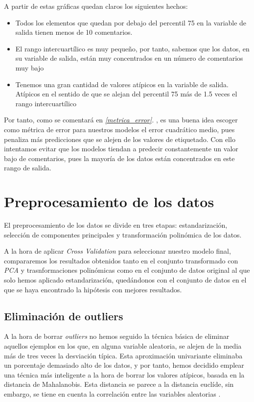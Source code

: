 \documentclass[11pt]{article}
\begin{document}
A partir de estas gráficas quedan claros los siguientes hechos:

\begin{itemize}
  \item Todos los elementos que quedan por debajo del percentil 75 en la variable de salida tienen menos de 10 comentarios. 
  \item El rango intercuartílico es muy pequeño, por tanto, sabemos que los datos, en su variable de salida, están muy concentrados en un número de comentarios muy bajo
  \item Tenemos una gran cantidad de valores atípicos en la variable de salida. Atípicos en el sentido de que se alejan del percentil 75 más de 1.5 veces el rango intercuartílico
\end{itemize}

Por tanto, como se comentará en \emph{\ref{metrica_error}. }, es una buena idea escoger como métrica de error para nuestros modelos el error cuadrático medio, pues penaliza más predicciones que se alejen de los valores de etiquetado. Con ello intentamos evitar que los modelos tiendan a predecir constantemente un valor bajo de comentarios, pues la mayoría de los datos están concentrados en este rango de salida.
\pagebreak

\section{Preprocesamiento de los datos} \label{preprocesado}

El preprocesamiento de los datos se divide en tres etapas: estandarización, selección de componentes principales y transformación polinómica de los datos.

A la hora de aplicar \emph{Cross Validation} para seleccionar nuestro modelo final, compararemos los resultados obtenidos tanto en el conjunto transformado con \emph{PCA} y trasnformaciones polinómicas como en el conjunto de datos original al que solo hemos aplicado estandarización, quedándonos con el conjunto de datos en el que se haya encontrado la hipótesis con mejores resultados.

\subsection{Eliminación de outliers}

A la hora de borrar \emph{outliers} no hemos seguido la técnica básica de eliminar aquellos ejemplos en los que, en alguna variable aleatoria, se alejen de la media más de tres veces la desviación típica. Esta aproximación univariante eliminaba un porcentaje demasiado alto de los datos, y por tanto, hemos decidido emplear una técnica más inteligente a la hora de borrar los valores atípicos, basada en la distancia de Mahalanobis. Esta distancia se parece a la distancia euclíde, sin embargo, se tiene en cuenta la correlación entre las variables aleatorias \cite{wiki_mahalanobis:online}.
\end{document}
